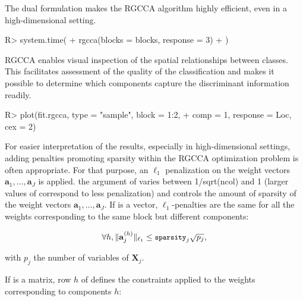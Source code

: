 \documentclass[
]{jss}
\begin{document}
\normalsize

The dual formulation makes the RGCCA algorithm highly efficient, even in
a high-dimensional setting.

\footnotesize

\begin{CodeChunk}
\begin{CodeInput}
R> system.time(
+   rgcca(blocks = blocks, response = 3)
+ )
\end{CodeInput}
\end{CodeChunk}

\normalsize

RGCCA enables visual inspection of the spatial relationships between
classes. This facilitates assessment of the quality of the
classification and makes it possible to determine which components
capture the discriminant information readily.

\footnotesize

\begin{CodeChunk}
\begin{CodeInput}
R> plot(fit.rgcca, type = "sample", block = 1:2,
+      comp = 1, response = Loc, cex = 2)
\end{CodeInput}
\end{CodeChunk}

\normalsize

For easier interpretation of the results, especially in high-dimensional
settings, adding penalties promoting sparsity within the RGCCA
optimization problem is often appropriate. For that purpose, an
\(\ell_1\) penalization on the weight vectors
\(\mathbf{a}_1, \ldots, \mathbf{a}_J\) is applied. the 
argument of  varies between 1/sqrt(ncol) and 1 (larger
values of  correspond to less penalization) and controls
the amount of sparsity of the weight vectors
\(\mathbf{a}_1, \ldots, \mathbf{a}_J\). If  is a vector,
\(\ell_1\)-penalties are the same for all the weights corresponding to
the same block but different components:

\begin{equation}
\forall h, \Vert \mathbf{a}_j^{(h)} \Vert_{\ell_1} \leq \small{\texttt{sparsity}}_j \sqrt{p_j},
\end{equation}

with \(p_j\) the number of variables of \(\mathbf X_j\).

If  is a matrix, row \(h\) of  defines the
constraints applied to the weights corresponding to components \(h\):
\end{document}
